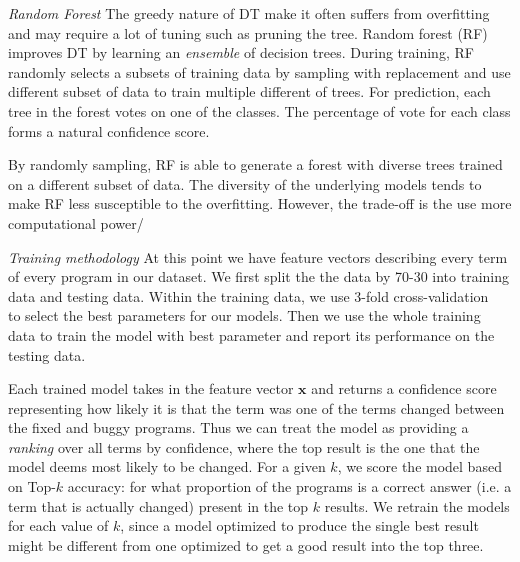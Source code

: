 \documentclass[conference]{IEEEtran}
\begin{document}

\emph{Random Forest}
%
The greedy nature of DT make it often suffers from overfitting and may
require a lot of tuning such as pruning the tree.
Random forest (RF)~\cite{breiman2001random} improves DT by learning an
\emph{ensemble} of decision trees.
During training, RF randomly selects a subsets of training data by sampling
with replacement and use different subset of data to train multiple different
of trees.
For prediction, each tree in the forest votes on one of the classes.
The percentage of vote for each class forms a natural confidence score.

By randomly sampling, RF is able to generate a forest with diverse trees
trained on a different subset of data.
The diversity of the underlying models tends to make RF less susceptible to
the overfitting.
However, the trade-off is the use more computational power/
%

%

\emph{Training methodology}
At this point we have feature vectors describing every term of every program in
our dataset.
We first split the the data by 70-30 into training data and testing data.
Within the training data, we use 3-fold cross-validation~\cite{kohavi} to
select the best parameters for our models.
Then we use the whole training data to train the model with best parameter
and report its performance on the testing data.

Each trained model takes in the feature vector $\mathbf{x}$ and returns a
confidence score representing how likely it is that the term was one of the
terms changed between the fixed and buggy programs.
Thus we can treat the model as providing a \emph{ranking} over all terms by
confidence, where the top result is the one that the model deems most likely
to be changed.
For a given $k$, we score the model based on Top-$k$ accuracy: for what
proportion of the programs is a correct answer (i.e. a term that is actually
changed) present in the top $k$ results.
We retrain the models for each value of $k$, since a model optimized to produce
the single best result might be different from one optimized to get a good
result into the top three.
\end{document}
